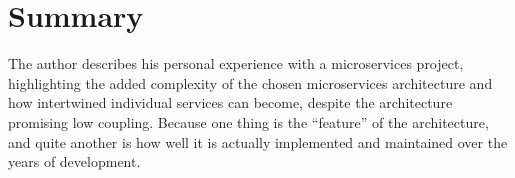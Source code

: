 \section{Summary}
The author describes his personal experience with a microservices project, highlighting the added complexity of the chosen microservices architecture and how intertwined individual services can become, despite the architecture promising low coupling. Because one thing is the ``feature'' of the architecture, and quite another is how well it is actually implemented and maintained over the years of development.





